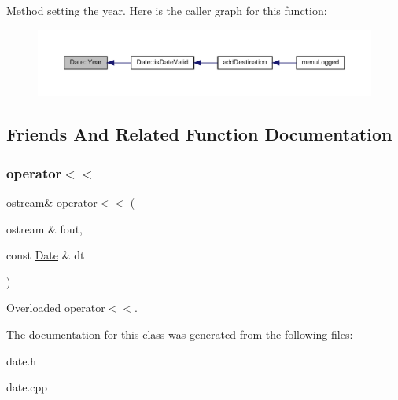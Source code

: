 Method setting the year. Here is the caller graph for this function\+:\nopagebreak
\begin{figure}[H]
\begin{center}
\leavevmode
\includegraphics[width=350pt]{class_date_a284f8985596b83ad9388b464eb6b54bd_icgraph}
\end{center}
\end{figure}


\subsection{Friends And Related Function Documentation}
\mbox{\label{class_date_affced1a8a8f9f0e9dd009af0a22dfe33}} 
\subsubsection{\texorpdfstring{operator$<$$<$}{operator<<}}
{\footnotesize\ttfamily ostream\& operator$<$$<$ (\begin{DoxyParamCaption}\item[{ostream \&}]{fout,  }\item[{const \hyperlink{class_date}{Date} \&}]{dt }\end{DoxyParamCaption})\hspace{0.3cm}{\ttfamily [friend]}}

Overloaded operator$<$$<$. 

The documentation for this class was generated from the following files\+:\begin{DoxyCompactItemize}
\item 
date.\+h\item 
date.\+cpp\end{DoxyCompactItemize}
